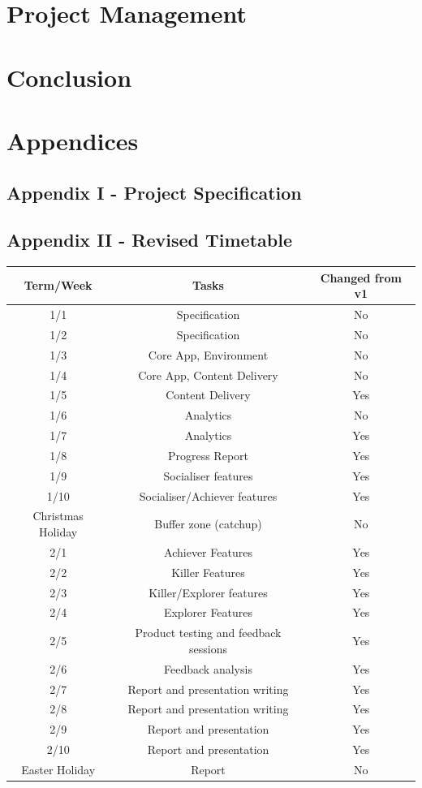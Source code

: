 \documentclass[10pt,a4paper]{report}
\begin{document}
\section*{Project Management}

\section*{Conclusion}

\section*{Appendices}

\subsection*{Appendix I - Project Specification}


\subsection*{Appendix II - Revised Timetable}
\begin{tabular}{|c|c|c|}
	\hline Term/Week & Tasks & Changed from v1 \\ 
	\hline 1/1 & Specification & No \\ 
	\hline 1/2 & Specification & No \\ 
	\hline 1/3 & Core App, Environment & No \\ 
	\hline 1/4 & Core App, Content Delivery & No \\
	\hline 1/5 & Content Delivery & Yes \\
	\hline 1/6 & Analytics & No \\ 
	\hline 1/7 & Analytics & Yes \\    
	\hline 1/8 & Progress Report & Yes \\
	\hline 1/9 & Socialiser features & Yes \\
	\hline 1/10 & Socialiser/Achiever features & Yes \\
	\hline Christmas Holiday & Buffer zone (catchup) & No \\
	\hline 2/1 & Achiever Features & Yes \\ 
	\hline 2/2 & Killer Features & Yes \\ 
	\hline 2/3 & Killer/Explorer features & Yes \\ 
	\hline 2/4 & Explorer Features & Yes \\ 
	\hline 2/5 & Product testing and feedback sessions & Yes \\ 
	\hline 2/6 & Feedback analysis & Yes \\ 
	\hline 2/7 & Report and presentation writing & Yes \\ 
	\hline 2/8 & Report and presentation writing & Yes \\ 
	\hline 2/9 & Report and presentation & Yes \\ 
	\hline 2/10 & Report and presentation & Yes \\
	\hline Easter Holiday & Report & No \\
	\hline 
\end{tabular}
\end{document}
